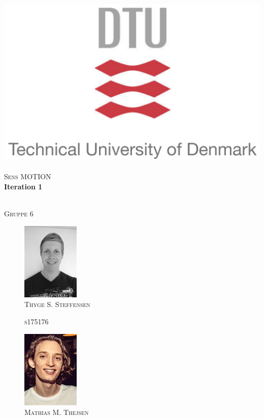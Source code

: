 \begin{titlepage}
\begin{center}

\includegraphics{Pictures/frontpage/dtu-logo.png}~\\[0.5cm]
\textsc{\Large Sens MOTION } \\%

\HRule 
{ \huge \bfseries Iteration 1 \\[0.1cm] } %

\HRule \\[0.8cm]
\textsc{Gruppe 6}
\begin{multicols}{4}
\columnbreak
    \begin{figure}[H]
        \centering
        \includegraphics[scale=0.6]{Pictures/frontpage/Thyge.png}\\
        \textsc{Thyge S. Steffensen}
        
        \textsc{s175176}\\
        \hfill \break
        \hfill \break
    \end{figure}
\columnbreak
    \begin{figure}[H]
        \centering
        \includegraphics[scale=0.8]{Pictures/frontpage/mathias.png}\\
        \textsc{Mathias M. Thejsen}
        

\end{figure}
\end{multicols}
\end{center}
\end{titlepage}
